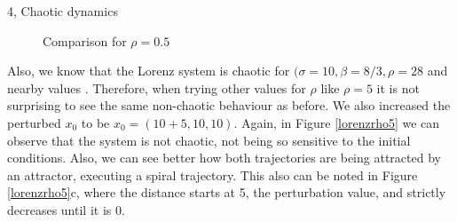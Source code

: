 \begin{task}{4, Chaotic dynamics}
\begin{figure}[H]
\centering
{}
\caption{Comparison for \(\rho = 0.5\)}
\label{lorenzrho05}
\end{figure}

Also, we know that the Lorenz system is chaotic for \((\sigma = 10, \beta = 8/3, \rho = 28\) and nearby values \cite{hirsch2012differential}. Therefore, when trying other values for \(\rho\) like \(\rho = 5\) it is not surprising to see the same non-chaotic behaviour as before. We also increased the perturbed \(x_0\) to be \(x_0 = (10+5, 10, 10)\). Again, in Figure \ref{lorenzrho5} we can observe that the system is not chaotic, not being so sensitive to the initial conditions. Also, we can see better how both trajectories are being attracted by an attractor, executing a spiral trajectory. This also can be noted in Figure \ref{lorenzrho5}c, where the distance starts at 5, the perturbation value, and strictly decreases until it is 0.


\end{task}
